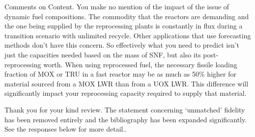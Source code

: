 \documentclass[answers,11pt]{exam}
\begin{document}
\begin{questions}

\question Comments on Content.
You make no mention of the impact of the issue of dynamic fuel compositions. 
The commodity that the reactors are demanding and the one being supplied 
by the reprocessing plants is constantly in flux during a transition 
scenario with unlimited recycle. Other applications that use forecasting 
methods don't have this concern.  So effectively what you need to predict 
isn't just the capacities needed based on the mass of SNF, but also its 
post-reprocessing worth. When using reprocessed fuel, the necessary fissile 
loading fraction of MOX or TRU in a fast reactor may be as much as 50\% 
higher for material sourced from a MOX LWR than from a UOX LWR. 
This difference will significantly impact your reprocessing capacity 
required to supply that material.

\begin{solution}
        Thank you for your kind review.
        The statement concerning `unmatched' fidelity has been removed
        entirely and the bibliography has been expanded significantly. See the
        responses below for more detail..
\end{solution}

\question 


\end{questions}
\end{document}
